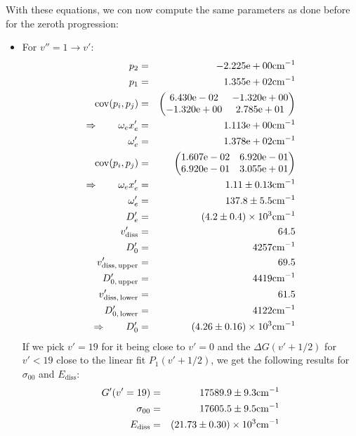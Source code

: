With these equations, we con now compute the same parameters as done before for the 
zeroth progression:
\begin{itemize}
    \item For $v'' = 1 \rightarrow v'$:
        \begin{eqnarray}
            p_2 &=& -2.225\mathrm{e}+00 \mathrm{cm^{-1}} \nonumber \\
            p_1 &=& 1.355\mathrm{e}+02 \mathrm{cm^{-1}} \nonumber \\
            \mathrm{cov}(p_i, p_j) &=& 
            \begin{pmatrix}
                6.430\mathrm{e}-02 &-1.320\mathrm{e}+00 \\
                -1.320\mathrm{e}+00 &2.785\mathrm{e}+01 \\
            \end{pmatrix}
            \\ \Rightarrow \qquad
            \omega_e x_e' &=& 1.113\mathrm{e}+00 \mathrm{cm^{-1}} \nonumber \\
            \omega_e' &=& 1.378\mathrm{e}+02 \mathrm{cm^{-1}} \nonumber \\
            \mathrm{cov}(p_i, p_j) &=& 
            \begin{pmatrix}
                1.607\mathrm{e}-02 &6.920\mathrm{e}-01 \\
                6.920\mathrm{e}-01 &3.055\mathrm{e}+01 \\
            \end{pmatrix}
            \\ \Rightarrow \qquad
            \omega_e x_e' &=& 1.11 \pm 0.13 \mathrm{cm^{-1}}\\
            \omega_e' &=& 137.8 \pm 5.5 \mathrm{cm^{-1}} \\
            D_e' &=& \left(4.2 \pm 0.4\right) \times 10^{3} \mathrm{cm^{-1}} \\
            v_\mathrm{diss}' &=& 64.5 \\
            D_0' &=& 4257 \mathrm{cm^{-1}} \\
            v_\mathrm{diss,\, upper}' &=& 69.5 \\
            D_{0,\, \mathrm{upper}}' &=& 4419 \mathrm{cm^{-1}}\\
            v_\mathrm{diss,\, lower}' &=& 61.5 \\
            D_{0,\, \mathrm{lower}}' &=& 4122 \mathrm{cm^{-1}} \\
            \Rightarrow \qquad
            D_0' &=& \left(4.26 \pm 0.16\right) \times 10^{3} \mathrm{cm^{-1}}
        \end{eqnarray}
        If we pick $v' = 19$ for it being close to $v' = 0$ and the $\Delta G(v' + 1/2)$ 
        for $v' < 19$ close to the linear fit $P_1(v' + 1/2)$, we get the following results for 
        $\sigma_{00}$ and $E_\mathrm{diss}$:
        \begin{eqnarray}
            G'(v' = 19) &=& 17589.9 \pm 9.3 \mathrm{cm^{-1}} \\
            \sigma_{00} &=& 17605.5 \pm 9.5 \mathrm{cm^{-1}} \\
            E_\mathrm{diss} &=& \left(21.73 \pm 0.30\right) \times 10^{3} \mathrm{cm^{-1}}
        \end{eqnarray}
    \end{itemize}
